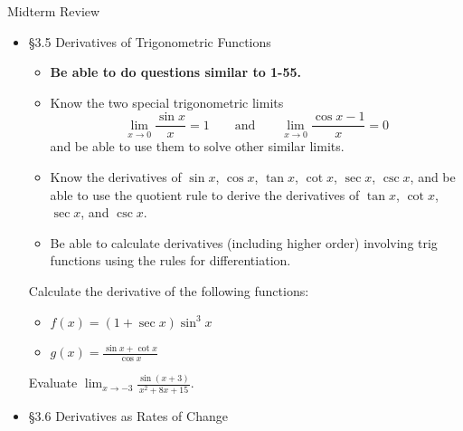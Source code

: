 \documentclass[cal1spr16Lectures.tex]{subfiles}
\begin{document}
\begin{frame}[allowframebreaks]{Midterm Review}
\begin{itemize}
{\bf Note:} Functions are not always given by a formula.  When faced with a problem where you don't know where to start, go through the rules first.
%
\framebreak
\begin{exe} Suppose you have the following information about the functions $f$ and $g$:
\[f(1)=6\quad f'(1)=2\quad g(1)=2\quad g'(1)=3\]
\vspace{-1pc}	
	\begin{itemize}\footnotesize
	\item Let $F=2f+3g$.  What is $F(1)$?  What is $F'(1)$?
	\item Let $G=fg$.  What is $G(1)$?  What is $G'(1)$?
	\end{itemize}
\end{exe}
%
\framebreak
\item \S 3.5 Derivatives of Trigonometric Functions
	\begin{itemize}\footnotesize
	\item {\bf Be able to do questions similar to 1-55.}
	\item Know the two special trigonometric limits
	\vspace{-0.5pc}
	\[\lim_{x\to 0}\frac{\sin x}{x}=1\qquad\text{and}\qquad\lim_{x\to 0}\frac{\cos x-1}{x}=0\]
	and be able to use them to solve other similar limits.
	\item Know the derivatives of $\sin x$, $\cos x$, $\tan x$, $\cot x$, $\sec x$, $\csc x$, and be able to use the quotient rule to derive the derivatives of $\tan x$, $\cot x$, $\sec x$, and $\csc x$.
	\item Be able to calculate derivatives (including higher order) involving trig functions using the rules for differentiation.
	\end{itemize}
%
\framebreak
\begin{exe}
Calculate the derivative of the following functions:
\begin{itemize}
\item $f(x)=(1+\sec x)\sin^3x$
%
\item $g(x)=\displaystyle\frac{\sin x+\cot x}{\cos x}$
\end{itemize}
\end{exe}
%
%
\begin{exe} Evaluate $\displaystyle\lim_{x\to -3}\frac{\sin{(x+3)}}{x^2+8x+15}$. \end{exe}
%
%
\framebreak
\item \S 3.6 Derivatives as Rates of Change

\end{itemize}
\end{frame}
\end{document}

